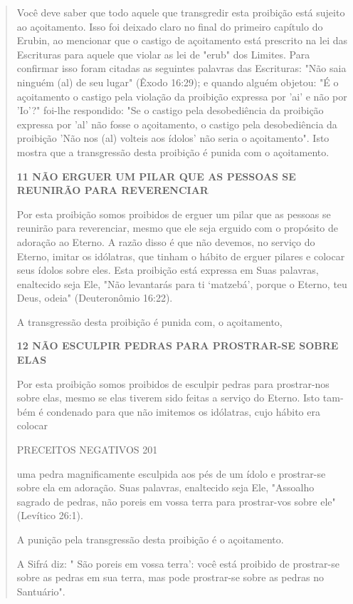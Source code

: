 \begin{quote}
Você deve saber que todo aquele que transgredir esta proibição está
sujeito ao açoitamento. Isso foi deixado claro no final do primeiro
capítulo do Erubin, ao mencionar que o castigo de açoitamento está
prescrito na lei das Escrituras para aquele que violar as lei de "erub"
dos Limites. Para confirmar isso foram citadas as seguintes palavras das
Escrituras: "Não saia ninguém (al) de seu lugar" (Êxodo 16:29); e quando
alguém objetou: "É o açoitamento o castigo pela violação da proibição
expressa por 'ai' e não por 'Io'?" foi-lhe res­pondido: "Se o castigo
pela desobediência da proibição expressa por 'al' não fosse o
açoitamento, o castigo pela desobediência da proibição 'Não nos (al)
volteis aos ídolos' não seria o açoitamento". Isto mostra que a
transgressão desta proibição é punida com o açoitamento.

\textbf{11 NÃO ERGUER UM PILAR QUE AS PESSOAS SE REUNIRÃO PARA
REVERENCIAR}

Por esta proibição somos proibidos de erguer um pilar que as pessoas se
reunirão para reverenciar, mesmo que ele seja erguido com o propósito de
ado­ração ao Eterno. A razão disso é que não devemos, no serviço do
Eterno, imitar os idólatras, que tinham o hábito de erguer pilares e
colocar seus ídolos sobre eles. Esta proibição está expressa em Suas
palavras, enaltecido seja Ele, "Não levan­tarás para ti `matzebá',
porque o Eterno, teu Deus, odeia" (Deuteronômio 16:22).

A transgressão desta proibição é punida com, o açoitamento,

\textbf{12 NÃO ESCULPIR PEDRAS PARA PROSTRAR-SE SOBRE ELAS}

Por esta proibição somos proibidos de esculpir pedras para prostrar-nos
sobre elas, mesmo se elas tiverem sido feitas a serviço do Eterno. Isto
tam­bém é condenado para que não imitemos os idólatras, cujo hábito era
colocar

PRECEITOS NEGATIVOS 201

uma pedra magnificamente esculpida aos pés de um ídolo e prostrar-se
sobre ela em adoração. Suas palavras, enaltecido seja Ele, "Assoalho
sagrado de pe­dras, não poreis em vossa terra para prostrar-vos sobre
ele" (Levítico 26:1).

A punição pela transgressão desta proibição é o açoitamento.

A Sifrá diz: " São poreis em vossa terra': você está proibido de
prostrar-se sobre as pedras em sua terra, mas pode prostrar-se sobre as
pedras no Santuário".
\end{quote}

